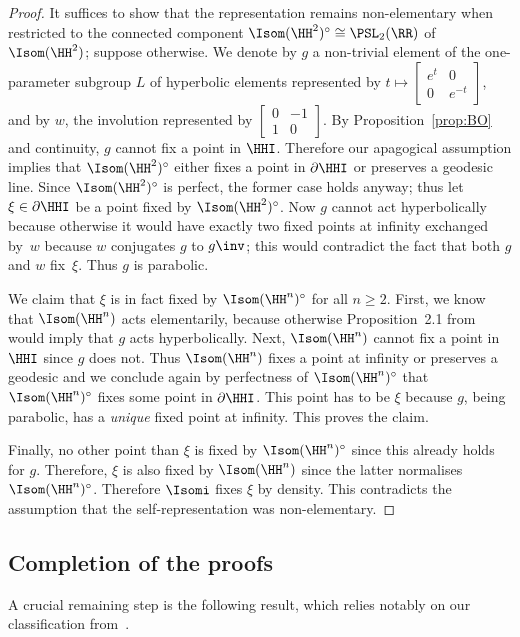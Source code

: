 \begin{proof}
It suffices to show that the representation remains non-elementary when restricted to the connected component $\Isom(\HH^2)^\circ\cong \PSL_2(\RR)$ of $\Isom(\HH^2)$; suppose otherwise. We denote by $g$ a non-trivial element of the one-parameter subgroup $L$ of hyperbolic elements represented by $t\mapsto \left[\begin{smallmatrix}e^t&0\\ 0&e^{-t}\end{smallmatrix}\right]$, and by $w$, the involution represented by $\left[\begin{smallmatrix}0&-1\\ 1&0\end{smallmatrix}\right]$. By Proposition~\ref{prop:BO} and continuity, $g$ cannot fix a point in $\HHI$. Therefore our apagogical assumption implies that $\Isom(\HH^2)^\circ$ either fixes a point in $\partial\HHI$ or preserves a geodesic line. Since $\Isom(\HH^2)^\circ$ is perfect, the former case holds anyway; thus let $\xi\in\partial\HHI$ be a point fixed by $\Isom(\HH^2)^\circ$. Now $g$ cannot act hyperbolically because otherwise it would have exactly two fixed points at infinity exchanged by~$w$ because $w$ conjugates $g$ to $g\inv
$; this would contradict the fact that both $g$ and $w$ fix~$\xi$. Thus $g$ is parabolic.

We claim that $\xi$ is in fact fixed by $\Isom(\HH^n)^\circ$ for all $n\geq 2$. First, we know that $\Isom(\HH^n)$ acts elementarily, because otherwise Proposition~2.1 from~\cite{Monod-Py} would imply that $g$ acts hyperbolically. Next, $\Isom(\HH^n)$ cannot fix a point in $\HHI$ since $g$ does not. Thus $\Isom(\HH^n)$ fixes a point at infinity or preserves a geodesic and we conclude again by perfectness of $\Isom(\HH^n)^\circ$ that $\Isom(\HH^n)^\circ$ fixes some point in $\partial\HHI$. This point has to be $\xi$ because $g$, being parabolic, has a \emph{unique} fixed point at infinity. This proves the claim.

Finally, no other point than $\xi$ is fixed by $\Isom(\HH^n)^\circ$ since this already holds for $g$. Therefore, $\xi$ is also fixed by $\Isom(\HH^n)$ since the latter normalises $\Isom(\HH^n)^\circ$. Therefore $\Isomi$ fixes $\xi$ by density. This contradicts the assumption that the self-representation was non-elementary.
\end{proof}

\subsection{Completion of the proofs} A crucial remaining step is the following result, which relies notably on our classification from~\cite{Monod-Py}.

